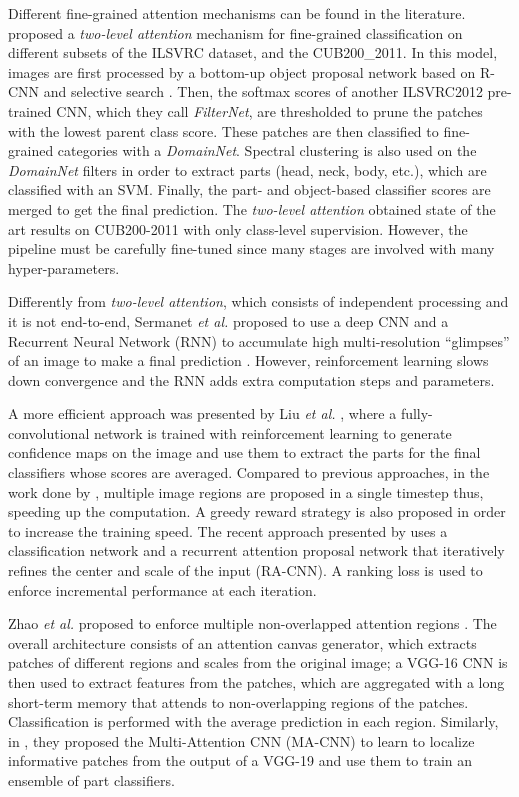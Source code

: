 \documentclass[runningheads]{llncs}
\begin{document}
Different fine-grained attention mechanisms can be found in the literature. \cite{xiao2015application} proposed a \emph{two-level attention} mechanism for fine-grained classification on different subsets of the ILSVRC \cite{russakovsky2012imagenet} dataset, and the CUB200\_2011. In this model, images are first processed by a bottom-up object proposal network based on R-CNN \cite{zhang2014part} and selective search \cite{uijlings2013selective}. Then, the softmax scores of another ILSVRC2012 pre-trained CNN, which they call \emph{FilterNet}, are thresholded to prune the patches with the lowest parent class score. These patches are then classified to fine-grained categories with a \emph{DomainNet}. Spectral clustering is also used on the \emph{DomainNet} filters in order to extract parts (head, neck, body, etc.), which are classified with an SVM. Finally, the part- and object-based classifier scores are merged to get the final prediction. The \emph{two-level attention} obtained state of the art results on CUB200-2011 with only class-level supervision. However, the pipeline must be carefully fine-tuned since many stages are involved with many hyper-parameters.

Differently from \emph{two-level attention}, which consists of independent processing and it is not end-to-end, Sermanet \emph{et al.} proposed to use a deep CNN and a Recurrent Neural Network (RNN) to accumulate high multi-resolution ``glimpses'' of an image to make a final prediction \cite{sermanet2014attention}. However, reinforcement learning slows down convergence and the RNN adds extra computation steps and parameters.

A more efficient approach was presented by Liu \emph{et al.} \cite{liu2016fully}, where a fully-convolutional network is trained with reinforcement learning to generate confidence maps on the image and use them to extract the parts for the final classifiers whose scores are averaged. Compared to previous approaches, in the work done by \cite{liu2016fully}, multiple image regions are proposed in a single timestep thus, speeding up the computation. A greedy reward strategy is also proposed in order to increase the training speed. The recent approach presented by \cite{fu2017look} uses a classification network and a recurrent attention proposal network that iteratively refines the center and scale of the input (RA-CNN). A ranking loss is used to enforce incremental performance at each iteration.

Zhao \emph{et al.} proposed to enforce multiple non-overlapped attention regions \cite{zhao2017diversified}. The overall architecture consists of an attention canvas generator, which extracts patches of different regions and scales from the original image; a VGG-16 \cite{simonyan2014very} CNN is then used to extract features from the patches, which are aggregated with a long short-term memory \cite{hochreiter1997long} that attends to non-overlapping regions of the patches. Classification is performed with the average prediction in each region. Similarly, in \cite{zheng2017learning}, they proposed the Multi-Attention CNN (MA-CNN) to learn to localize informative patches from the output of a VGG-19 and use them to train an ensemble of part classifiers.
\end{document}
